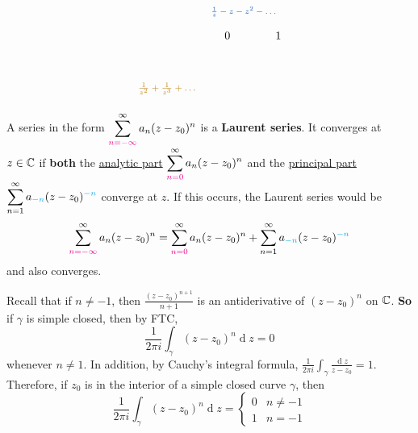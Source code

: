 \documentclass[12pt]{article}
\renewcommand{\d}{\ensuremath{\operatorname{d}}}
\begin{document}
\[\begin{tikzpicture}[x=0.75pt,y=0.75pt,yscale=-1,xscale=1]
    \draw (167,152.4) node [anchor=north west][inner sep=0.75pt]    {$0$};
    \draw (227,152.4) node [anchor=north west][inner sep=0.75pt]    {$1$};
    \draw (151,122.4) node [anchor=north west][inner sep=0.75pt]  [font=\scriptsize,color={rgb, 255:red, 25; green, 96; blue, 175 }  ,opacity=1 ]  {$\frac{1}{z} -z-z^{2} -\dotsc $};
    \draw (65,212.4) node [anchor=north west][inner sep=0.75pt]  [font=\footnotesize,color={rgb, 255:red, 194; green, 132; blue, 28 }  ,opacity=1 ]  {$\frac{1}{z^{2}} +\frac{1}{z^{3}} +\dotsc $};
    
    
    \end{tikzpicture}
    \]

 A series in the form $\displaystyle \sum_{\textcolor{magenta}{n=-\infty}}^{\infty}a_n(z-z_0)^n$ is a \textbf{Laurent series}. It converges at $z\in \mathbb{C}$ if \textbf{both} the \uline{analytic part} \(\displaystyle \sum_{\textcolor{magenta}{n=0}}^{\infty}a_n(z-z_0)^n\) and the \uline{principal part} \(\displaystyle \sum_{n=1}^{\infty}a_{\textcolor{cyan}{-n}}(z-z_0)^{\textcolor{cyan}{-n}}\) converge at $z$. If this occurs, the Laurent series would be \[\sum_{\textcolor{magenta}{n=-\infty}}^{\infty}a_n(z-z_0)^n = \sum_{\textcolor{magenta}{n=0}}^{\infty}a_n(z-z_0)^n +\sum_{n=1}^{\infty}a_{\textcolor{cyan}{-n}}(z-z_0)^{\textcolor{cyan}{-n}}\] and also converges.

\lemma Recall that if $n\neq -1$, then $\frac{(z-z_0)^{n+1}}{n+1}$ is an antiderivative of $(z-z_0)^n$ on $\mathbb{C}$. \textbf{So} if $\gamma$ is simple closed, then by FTC, \[\frac{1}{2\pi i}\int_{\gamma}(z-z_0)^n\d z=0\] whenever $n\neq 1$. In addition, by Cauchy's integral formula, $\frac{1}{2\pi i}\int_{\gamma}\frac{\d z}{z-z_0}=1$. Therefore, if $z_0$ is in the interior of a simple closed curve $\gamma$, then \[\frac{1}{2\pi i}\int_{\gamma}(z-z_0)^n\d z= \begin{cases}
    0 & n\neq -1\\
    1 & n=-1
\end{cases}\]
\end{document}
